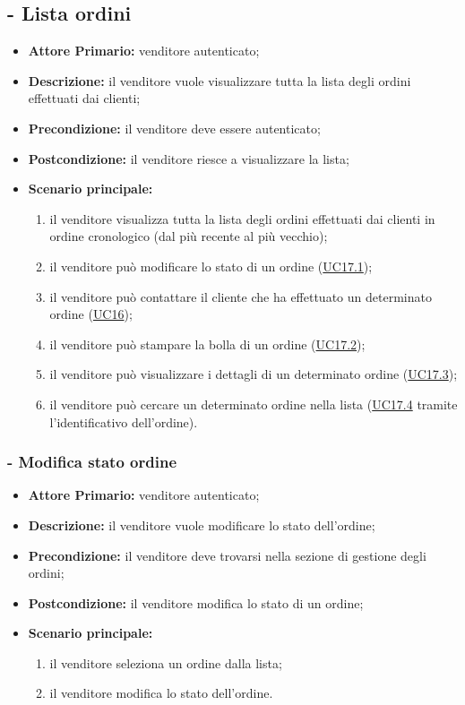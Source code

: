 \subsection{ - Lista ordini}
\begin{itemize}
    \item \textbf{Attore Primario:} venditore autenticato;
    \item \textbf{Descrizione:} il venditore vuole visualizzare tutta la lista degli ordini effettuati dai clienti;
    \item \textbf{Precondizione:} il venditore deve essere autenticato;
    \item \textbf{Postcondizione:} il venditore riesce a visualizzare la lista;
    \item \textbf{Scenario principale:}
          \begin{enumerate}
              \item il venditore visualizza tutta la lista degli ordini effettuati dai clienti in ordine cronologico (dal più recente al più vecchio);
              \item il venditore può modificare lo stato di un ordine (\hyperref[UC17.1]{UC17.1});
              \item il venditore può contattare il cliente che ha effettuato un determinato ordine (\hyperref[UC16]{UC16});
              \item il venditore può stampare la bolla di un ordine (\hyperref[UC17.2]{UC17.2});
              \item il venditore può visualizzare i dettagli di un determinato ordine (\hyperref[UC17.3]{UC17.3});
              \item il venditore può cercare un determinato ordine nella lista (\hyperref[UC17.4]{UC17.4} tramite l'identificativo dell'ordine).
            \end{enumerate}
\end{itemize}

\stepsubUserCase
\subsubsection{- Modifica stato ordine}
\begin{itemize}
    \item \textbf{Attore Primario:} venditore autenticato;
    \item \textbf{Descrizione:} il venditore vuole modificare lo stato dell'ordine;
    \item \textbf{Precondizione:} il venditore deve trovarsi nella sezione di gestione degli ordini;
    \item \textbf{Postcondizione:} il venditore modifica lo stato di un ordine;
    \item \textbf{Scenario principale:}
          \begin{enumerate}
              \item il venditore seleziona un ordine dalla lista;
              \item il venditore modifica lo stato dell'ordine.
          \end{enumerate}
\end{itemize}

